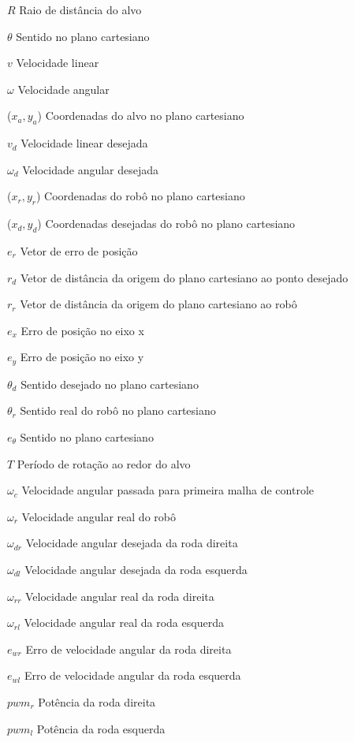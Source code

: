 %
%

\begin{simbolos}
	\item[$R$] Raio de distância do alvo
	\item[$\theta$] Sentido no plano cartesiano
	\item[$v$] Velocidade linear
	\item[$\omega$] Velocidade angular
	\item[($x_{a},y_{a}$)] Coordenadas do alvo no plano cartesiano
	\item[$v_{d}$] Velocidade linear desejada
	\item[$\omega_{d}$] Velocidade angular desejada
	\item[($x_{r},y_{r}$)] Coordenadas do robô no plano cartesiano
	\item[($x_{d},y_{d}$)] Coordenadas desejadas do robô no plano cartesiano
	\item[$e_{r}$] Vetor de erro de posição
	\item[$r_{d}$] Vetor de distância da origem do plano cartesiano ao ponto desejado
	\item[$r_{r}$] Vetor de distância da origem do plano cartesiano ao robô
	\item[$e_{x}$] Erro de posição no eixo x
	\item[$e_{y}$] Erro de posição no eixo y
	\item[$\theta_{d}$] Sentido desejado no plano cartesiano
	\item[$\theta_{r}$] Sentido real do robô no plano cartesiano
	\item[$e_{\theta}$] Sentido no plano cartesiano
	\item[$T$] Período de rotação ao redor do alvo
	\item[$ \omega _{c} $] Velocidade angular passada para primeira malha de controle
	\item[$ \omega _{r} $] Velocidade angular real do robô
	\item[$ \omega _{dr} $] Velocidade angular desejada da roda direita
	\item[$ \omega _{dl} $] Velocidade angular desejada da roda esquerda
    \item[$ \omega _{rr} $] Velocidade angular real da roda direita
    \item[$ \omega _{rl} $] Velocidade angular real da roda esquerda
    \item[$  e_{wr} $] Erro de velocidade angular da roda direita 
    \item[$  e_{wl} $] Erro de velocidade angular da roda esquerda
    \item[$  pwm_{r} $] Potência da roda direita 
    \item[$  pwm_{l} $] Potência da roda esquerda
\end{simbolos}
